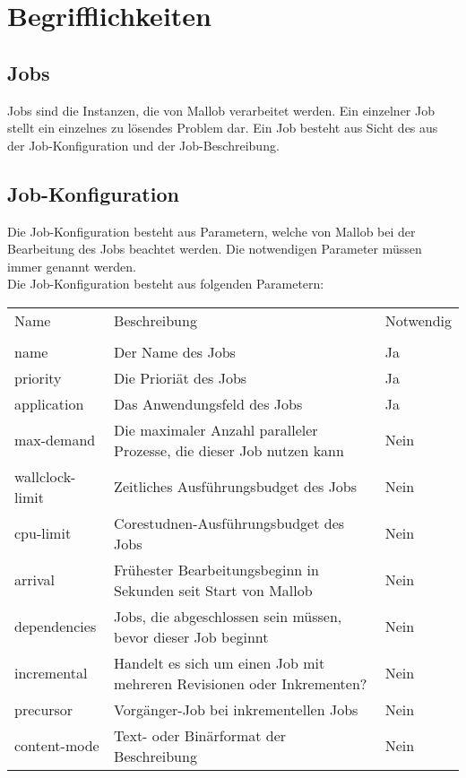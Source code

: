 \section{Begrifflichkeiten}

\subsection{Jobs}
\label{B:Jobs}

Jobs sind die Instanzen, die von Mallob verarbeitet werden. Ein einzelner Job stellt ein einzelnes zu lösendes Problem dar. Ein Job besteht aus Sicht des  aus der Job-Konfiguration und der Job-Beschreibung.

\subsection{Job-Konfiguration}
\label{B:Job-Konfiguration}
Die Job-Konfiguration besteht aus Parametern, welche von Mallob bei der Bearbeitung des Jobs beachtet werden. Die notwendigen Parameter müssen immer genannt werden.\\
Die Job-Konfiguration besteht aus folgenden Parametern: \\

\begin{tabular}{lL{0.6\textwidth}l}
        Name & Beschreibung & Notwendig\\
        \\
        name & Der Name des Jobs & Ja\\
        priority & Die Prioriät des Jobs & Ja\\
        application & Das Anwendungsfeld des Jobs & Ja\\ 
        max-demand & Die maximaler Anzahl paralleler Prozesse, die dieser Job nutzen kann & Nein\\
        wallclock-limit & Zeitliches Ausführungsbudget des Jobs & Nein\\
        cpu-limit & Corestudnen-Ausführungsbudget des Jobs & Nein\\
        arrival & Frühester Bearbeitungsbeginn in Sekunden seit Start von Mallob & Nein\\
        dependencies & Jobs, die abgeschlossen sein müssen, bevor dieser Job beginnt & Nein\\
        incremental & Handelt es sich um einen Job mit mehreren Revisionen oder Inkrementen? &  Nein\\
        precursor & Vorgänger-Job bei inkrementellen Jobs & Nein\\
        content-mode & Text- oder Binärformat der Beschreibung & Nein\\
    \end{tabular} 
    
